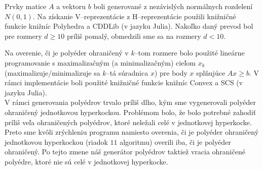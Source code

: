 Prvky matice $A$ a vektoru $b$ boli generované z nezávislých normálnych rozdelení $N(0,1)$. Na získanie V--reprezentácie z H--reprezentácie použili knižničné funkcie knižníc Polyhedra a CDDLib (v jazyku Julia). Nakoľko daný prevod bol pre rozmery $d \geq 10$ príliš pomalý, obmedzili sme sa na rozmery $d <10$.

Na overenie, či je polyéder ohraničený v $k$--tom rozmere bolo použité lineárne programovanie s maximalizačným (a minimalizačným) cieľom $x_k$ (maximalizuje/minimalizuje sa $k$--tá súradnica $x$) pre body $x$ splňujúce $Ax \geq b$. V rámci implementácie boli použité knižničné funkcie knižníc Convex a SCS (v jazyku Julia).\\

V rámci generovania polyédrov trvalo príliš dlho, kým sme vygenerovali polyéder ohraničený jednotkovou hyperkockou. Problémom bolo, že bolo potrebné zahodiť príliš veľa ohraničených polyédrov, ktoré neležali celé v jednotkovej hyperkocke. Preto sme kvôli zrýchleniu programu namiesto overenia, či je polyéder ohraničený jednotkovou hyperkockou (riadok $11$ algoritmu) overili iba, či je polyéder ohraničený.
Po tejto zmene náš generátor polyédrov taktiež vracia ohraničené polyédre, ktoré nie sú celé v jednotkovej hyperkocke. \\

